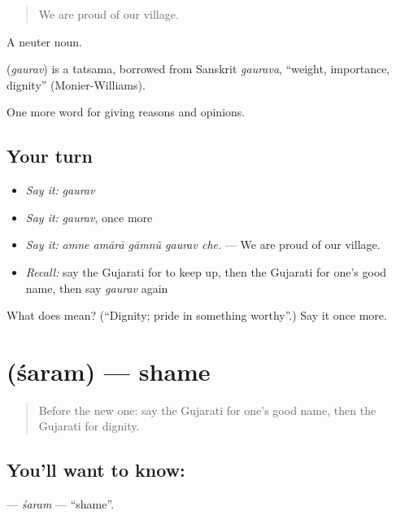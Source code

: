 \begin{quote}
We are proud of our village.
\end{quote}

A neuter noun.

\begin{cousinweb}
\textbf{} (\emph{gaurav}) is a tatsama, borrowed from Sanskrit \emph{gaurava}, \textquotedblleft{}weight, importance, dignity\textquotedblright{} (Monier-Williams).
\end{cousinweb}

\begin{grammarlens}[title={What you've built}]
One more word for giving reasons and opinions.
\end{grammarlens}

\subsection*{Your turn}
\begin{itemize}
\raggedright
  \item \emph{Say it:} \emph{gaurav}
  \item \emph{Say it:} \emph{gaurav}, once more
  \item \emph{Say it:} \emph{amne amārā gāmnũ gaurav che.} — We are proud of our village.
  \item \emph{Recall:} say the Gujarati for to keep up, then the Gujarati for one's good name, then say \emph{gaurav} again
\end{itemize}

\begin{tcolorbox}[breakable,colback=teal!4,colframe=teal!35!black,title={Before you move on}]
What does  mean? (\textquotedblleft{}Dignity; pride in something worthy\textquotedblright{}.) Say it once more.
\end{tcolorbox}
\section[\texorpdfstring{\gu{શરમ} (śaram)}{શરમ (śaram)}]{ (śaram) — shame}

\label{lesson:GU-C359-saram}



\begin{quote}
Before the new one: say the Gujarati for one's good name, then the Gujarati for dignity.
\end{quote}

\subsection*{You'll want to know: }
\textbf{} — \emph{śaram} — \textquotedblleft{}shame\textquotedblright{}.


